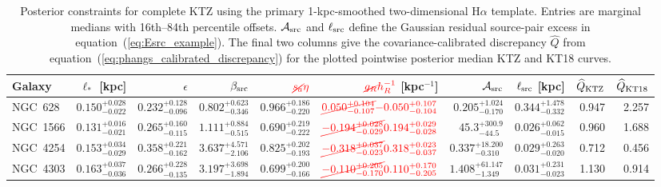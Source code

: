 \documentclass[fleqn,usenatbib]{mnras}
\newcommand{\revaddmath}[1]{\textcolor{red}{#1}}
\newcommand{\revdelmath}[1]{\textcolor{red}{\cancel{#1}}}
\begin{document}
\begin{table}
\centering
\footnotesize
\renewcommand{\arraystretch}{1.3}
\setlength{\tabcolsep}{3.2pt}
\caption{Posterior constraints for complete KTZ using the primary 1-kpc-smoothed two-dimensional H$\alpha$ template.  Entries are marginal medians with 16th--84th percentile offsets.  ${\cal A}_{\rm src}$ and $\ell_{\rm src}$ define the Gaussian residual source-pair excess in equation~(\ref{eq:Esrc_example}).  The final two columns give the covariance-calibrated discrepancy $\widehat Q$ from equation~(\ref{eq:phangs_calibrated_discrepancy}) for the plotted pointwise posterior median KTZ and KT18 curves.}
\label{tab:phangs_posteriors}
\begin{tabular}{@{}lrrrrrrrrr@{}}
\toprule
Galaxy & $\ell_\ast$ [kpc] & $\epsilon$ & $\beta_{\rm src}$ & $\revdelmath{s_a}\revaddmath{\eta}$ & $\revdelmath{g_R}\revaddmath{h_R^{-1}}$ [kpc$^{-1}$] & ${\cal A}_{\rm src}$ & $\ell_{\rm src}$ [kpc] & $\widehat Q_{\rm KTZ}$ & $\widehat Q_{\rm KT18}$\\
\midrule
NGC~628
& $0.150_{-0.022}^{+0.028}$ & $0.232_{-0.096}^{+0.128}$ & $0.802_{-0.346}^{+0.623}$ & $0.966_{-0.220}^{+0.186}$ & $\revdelmath{0.050_{-0.107}^{+0.104}}\revaddmath{-0.050_{-0.104}^{+0.107}}$ & $0.205_{-0.170}^{+1.024}$ & $0.344_{-0.332}^{+1.478}$ & 0.947 & 2.257\\
NGC~1566
& $0.131_{-0.021}^{+0.016}$ & $0.265_{-0.115}^{+0.160}$ & $1.111_{-0.515}^{+0.884}$ & $0.690_{-0.222}^{+0.219}$ & $\revdelmath{-0.194_{-0.029}^{+0.028}}\revaddmath{0.194_{-0.028}^{+0.029}}$ & $45.3_{-44.5}^{+300.9}$ & $0.026_{-0.015}^{+0.062}$ & 0.960 & 1.688\\
NGC~4254
& $0.153_{-0.029}^{+0.034}$ & $0.358_{-0.162}^{+0.221}$ & $3.637_{-2.106}^{+4.571}$ & $0.825_{-0.193}^{+0.202}$ & $\revdelmath{-0.318_{-0.023}^{+0.037}}\revaddmath{0.318_{-0.037}^{+0.023}}$ & $0.337_{-0.310}^{+18.200}$ & $0.029_{-0.020}^{+0.263}$ & 0.712 & 0.456\\
NGC~4303
& $0.163_{-0.036}^{+0.037}$ & $0.266_{-0.135}^{+0.228}$ & $3.197_{-1.894}^{+3.698}$ & $0.699_{-0.166}^{+0.200}$ & $\revdelmath{-0.110_{-0.170}^{+0.205}}\revaddmath{0.110_{-0.205}^{+0.170}}$ & $1.408_{-1.349}^{+61.147}$ & $0.031_{-0.023}^{+0.231}$ & 1.130 & 0.914\\
\bottomrule
\end{tabular}
\end{table}
\end{document}
